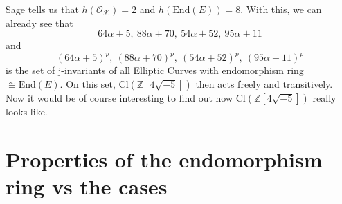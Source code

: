 \documentclass{scrartcl}
\newcommand{\Z}{\mathbb{Z}}
\newcommand{\End}{\mathrm{End}}
\newcommand{\Cl}{\mathrm{Cl}}
\newcommand{\K}{\mathcal{K}}
\renewcommand{\O}{\mathcal{O}}
\theoremstyle{definition}
\begin{document}
Sage tells us that $h(\O_\K) = 2$ and $h(\End(E)) = 8$.
With this, we can already see that
\begin{equation*}
    64\alpha + 5, \ 88\alpha + 70, \ 54\alpha + 52, \ 95\alpha + 11
\end{equation*}
and
\begin{equation*}
    (64\alpha + 5)^p, \ (88\alpha + 70)^p, \ (54\alpha + 52)^p, \ (95\alpha + 11)^p
\end{equation*}
is the set of j-invariants of all Elliptic Curves with endomorphism ring $\cong \End(E)$.
On this set, $\Cl(\Z[4\sqrt{-5}])$ then acts freely and transitively.
Now it would be of course interesting to find out how $\Cl(\Z[4\sqrt{-5}])$ really looks like.

\section{Properties of the endomorphism ring vs the cases}
\end{document}

